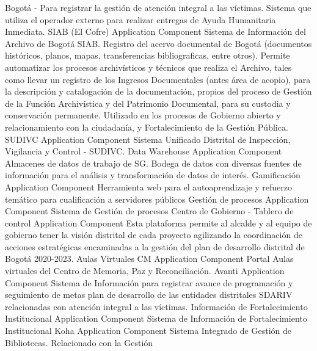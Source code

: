 \documentclass[
	a4paper, %
	12pt, %
]{include/CSSullivanBusinessReport}
\begin{document}
Bogotá - Para registrar la gestión de atención integral a las víctimas.
Sistema que utiliza el operador externo para realizar entregas de Ayuda
Humanitaria Inmediata. \textbar{} \textbar{} SIAB (El Cofre) \textbar{}
Application Component \textbar{} Sistema de Información del Archivo de
Bogotá SIAB. Registro del acervo documental de Bogotá (documentos
históricos, planos, mapas, transferencias bibliograficas, entre otros).
Permite automatizar los procesos archivísticos y técnicos que realiza el
Archivo, tales como llevar un registro de los Ingresos Documentales
(antes área de acopio), para la descripción y catalogación de la
documentación, propios del proceso de Gestión de la Función Archivística
y del Patrimonio Documental, para su custodia y conservación permanente.
Utilizado en los procesos de Gobierno abierto y relacionamiento con la
ciudadanía, y Fortalecimiento de la Gestión Pública. \textbar{}
\textbar{} SUDIVC \textbar{} Application Component \textbar{} Sistema
Unificado Distrital de Inspección, Vigilancia y Control - SUDIVC.
\textbar{} \textbar{} Data Warehouse \textbar{} Application Component
\textbar{} Almacenes de datos de trabajo de SG. Bodega de datos con
diversas fuentes de información para el análisis y transformación de
datos de interés. \textbar{} \textbar{} Gamificación \textbar{}
Application Component \textbar{} Herramienta web para el autoaprendizaje
y refuerzo temático para cualificación a servidores públicos \textbar{}
\textbar{} Gestión de procesos \textbar{} Application Component
\textbar{} Sistema de Gestión de procesos \textbar{} \textbar{} Centro
de Gobierno - Tablero de control \textbar{} Application Component
\textbar{} Esta plataforma permite al alcalde y al equipo de gobierno
tener la visión distrital de cada proyecto agilizando la coordinación de
acciones estratégicas encaminadas a la gestión del plan de desarrollo
distrital de Bogotá 2020-2023. \textbar{} \textbar{} Aulas Virtuales CM
\textbar{} Application Component \textbar{} Portal Aulas virtuales del
Centro de Memoria, Paz y Reconciliación. \textbar{} \textbar{} Avanti
\textbar{} Application Component \textbar{} Sistema de Información para
registrar avance de programación y seguimiento de metas plan de
desarrollo de las entidades distritales SDARIV relacionadas con atención
integral a las víctimas. \textbar{} \textbar{} Información de
Fortalecimiento Institucional \textbar{} Application Component
\textbar{} Sistema de Información de Fortalecimiento Institucional
\textbar{} \textbar{} Koha \textbar{} Application Component \textbar{}
Sistema Integrado de Gestión de Bibliotecas. Relacionado con la Gestión
\end{document}
